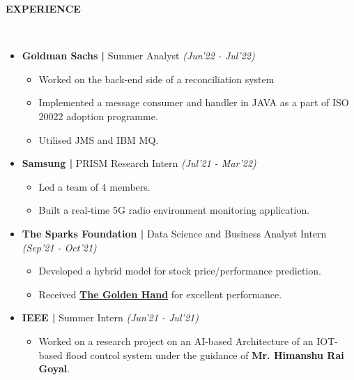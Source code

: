 \documentclass[a4paper,10pt]{article}
\newcommand{\lsep}{-0.5cm}
\newcommand{\resheading}[1]{{\small \colorbox{mygrey}{\begin{minipage}{0.98\textwidth}{\textbf{#1 \vphantom{p\^{E}}}}\end{minipage}}}}
\begin{document}
\resheading{\textbf{EXPERIENCE} }\\[\lsep]
\begin{itemize}[itemsep=0.01mm, parsep=0.1pt]
\item \textbf{Goldman Sachs |} Summer Analyst \textit{(Jun'22 - Jul'22)}\\[\lsep]
\begin{itemize}[itemsep=0.1mm]
\item Worked on the back-end side of a reconciliation system
\item Implemented a message consumer and handler in JAVA as a part of ISO 20022 adoption programme.
\item Utilised JMS and IBM MQ.
\end{itemize}
\item \textbf{Samsung |} PRISM Research Intern \textit{(Jul'21 - Mar'22)}\\[\lsep]
\begin{itemize}[itemsep=0.01mm]
\item Led a team of 4 members.
\item Built a real-time 5G radio environment monitoring application.
\end{itemize}
\item \textbf{The Sparks Foundation |} Data Science and Business Analyst Intern \textit{(Sep'21 - Oct'21)}\\[\lsep]
\begin{itemize}[itemsep=0.01mm]
\item Developed a hybrid model for stock price/performance prediction.
\item Received \href{https://truecertificates.com/verified/V5FZSXAR8E}{\textbf{The Golden Hand}} for excellent performance.
\end{itemize}
\item \textbf{IEEE |}  Summer Intern \textit{(Jun'21 - Jul'21)}\\[\lsep]
\begin{itemize}[itemsep=0.01mm]
\item Worked on a research project on an AI-based Architecture of an IOT-based flood control system under the guidance of \textbf{Mr. Himanshu Rai Goyal}.
\end{itemize}
\end{itemize}
\end{document}
